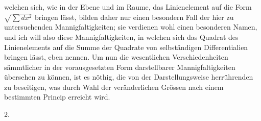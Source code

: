 \documentclass[a4paper,12pt]{article}
\begin{document}
welchen sich, wie in der Ebene und im Raume, das Linienelement
auf die Form
$\sqrt{ \sum dx^2 }$
bringen l\"{a}sst, bilden daher nur einen besondern Fall der hier
zu untersuchenden Mannigfaltigkeiten; sie verdienen wohl einen
besonderen Namen, und ich will also diese Mannigfaltigkeiten, in
welchen sich das Quadrat des Linienelements auf die Summe der
Quadrate von selbst\"{a}ndigen Differentialien bringen l\"{a}sst,
eben nennen.  Um nun die wesentlichen Verschiedenheiten
s\"{a}mmtlicher in der vorausgesetzten Form darstellbarer
Mannigfaltigkeiten \"{u}bersehen zu k\"{o}nnen, ist es
n\"{o}thig, die von der Darstellungsweise herr\"{u}hrenden zu
beseitigen, was durch Wahl der ver\"{a}nderlichen Gr\"{o}ssen
nach einem bestimmten Princip erreicht wird.

\medbreak

\centerline{2.}

\nobreak\medskip
\end{document}
